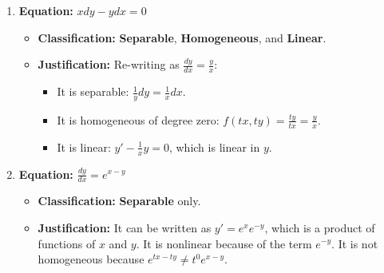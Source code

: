 \documentclass[11pt,letterpaper]{article}
\begin{document}
\begin{enumerate}[label=\textbf{\arabic*.}]
    \item \textbf{Equation:} $x dy - y dx = 0$
    \begin{itemize}
        \item \textbf{Classification:} \textbf{Separable}, \textbf{Homogeneous}, and \textbf{Linear}.
        \item \textbf{Justification:} 
        Re-writing as $\frac{dy}{dx} = \frac{y}{x}$:
        \begin{itemize}
            \item It is separable: $\frac{1}{y} dy = \frac{1}{x} dx$.
            \item It is homogeneous of degree zero: $f(tx, ty) = \frac{ty}{tx} = \frac{y}{x}$.
            \item It is linear: $y' - \frac{1}{x}y = 0$, which is linear in $y$.
        \end{itemize}
    \end{itemize}

    \item \textbf{Equation:} $\frac{dy}{dx} = e^{x-y}$
    \begin{itemize}
        \item \textbf{Classification:} \textbf{Separable} only.
        \item \textbf{Justification:} It can be written as $y' = e^x e^{-y}$, which is a product of functions of $x$ and $y$. It is nonlinear because of the term $e^{-y}$. It is not homogeneous because $e^{tx-ty} \neq t^0 e^{x-y}$.
    \end{itemize}
\end{enumerate}
\end{document}

